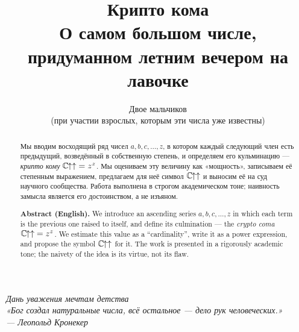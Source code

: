 \documentclass[11pt,a4paper]{article}
\title{\textbf{Крипто кома}\\[0.3em]
  \large О самом большом числе, придуманном летним вечером на лавочке}
\author{Двое мальчиков\\ \small (при участии взрослых, которым эти числа уже известны)}
\date{}
\newcommand{\ccoma}{\ensuremath{\mathbb{C}\mkern-1.5mu{\uparrow\uparrow}}}
\begin{document}
\maketitle

\begin{center}\itshape\small
Дань уважения мечтам детства\\[0.8em]
«Бог создал натуральные числа, всё остальное --- дело рук человеческих.»\\
\upshape\footnotesize --- Леопольд Кронекер
\end{center}
\medskip

\begin{abstract}
\noindent
Мы вводим восходящий ряд чисел \(a, b, c, \dots, z\), в котором каждый следующий член
есть предыдущий, возведённый в собственную степень, и определяем его кульминацию ---
\emph{крипто кому} \(\ccoma = z^{z}\). Мы оцениваем эту величину как «мощность»,
записываем её степенным выражением, предлагаем для неё символ \(\ccoma\) и выносим её
на суд научного сообщества. Работа выполнена в строгом академическом тоне; наивность
замысла является его достоинством, а не изъяном.
\end{abstract}

\begin{otherlanguage}{english}
\begin{abstract}
\noindent
\textbf{Abstract (English).} We introduce an ascending series \(a, b, c, \dots, z\) in
which each term is the previous one raised to itself, and define its culmination --- the
\emph{crypto coma} \(\ccoma = z^{z}\). We estimate this value as a ``cardinality'', write
it as a power expression, and propose the symbol \(\ccoma\) for it. The work is presented
in a rigorously academic tone; the naivety of the idea is its virtue, not its flaw.
\end{abstract}
\end{otherlanguage}










\nocite{*}


\end{document}
